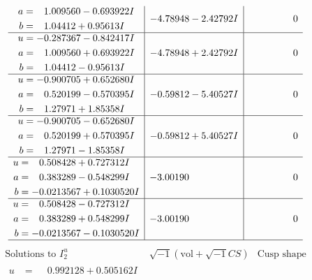 \documentclass[1p]{elsarticle_modified}
\theoremstyle{definition}
\newcommand{\I}{\sqrt{-1}}
\begin{document}
$$\begin{array}{c|c|c}
\begin{aligned}
a &= \phantom{-}1.009560 - 0.693922 I \\
b &= \phantom{-}1.04412 + 0.95613 I\end{aligned}
 & -4.78948 - 2.42792 I & \phantom{-0.000000 } 0 \\ \hline\begin{aligned}
u &= -0.287367 - 0.842417 I \\
a &= \phantom{-}1.009560 + 0.693922 I \\
b &= \phantom{-}1.04412 - 0.95613 I\end{aligned}
 & -4.78948 + 2.42792 I & \phantom{-0.000000 } 0 \\ \hline\begin{aligned}
u &= -0.900705 + 0.652680 I \\
a &= \phantom{-}0.520199 - 0.570395 I \\
b &= \phantom{-}1.27971 + 1.85358 I\end{aligned}
 & -0.59812 - 5.40527 I & \phantom{-0.000000 } 0 \\ \hline\begin{aligned}
u &= -0.900705 - 0.652680 I \\
a &= \phantom{-}0.520199 + 0.570395 I \\
b &= \phantom{-}1.27971 - 1.85358 I\end{aligned}
 & -0.59812 + 5.40527 I & \phantom{-0.000000 } 0 \\ \hline\begin{aligned}
u &= \phantom{-}0.508428 + 0.727312 I \\
a &= \phantom{-}0.383289 - 0.548299 I \\
b &= -0.0213567 + 0.1030520 I\end{aligned}
 & -3.00190\phantom{ +0.000000I} & \phantom{-0.000000 } 0 \\ \hline\begin{aligned}
u &= \phantom{-}0.508428 - 0.727312 I \\
a &= \phantom{-}0.383289 + 0.548299 I \\
b &= -0.0213567 - 0.1030520 I\end{aligned}
 & -3.00190\phantom{ +0.000000I} & \phantom{-0.000000 } 0\\
 \hline 
 \end{array}$$\newpage$$\begin{array}{c|c|c}  
\text{Solutions to }I^u_{2}& \I (\text{vol} + \sqrt{-1}CS) & \text{Cusp shape}\\
 \hline 
\begin{aligned}
u &= \phantom{-}0.992128 + 0.505162 I \\

\end{aligned}
\end{array}$$
\end{document}
